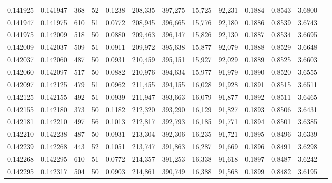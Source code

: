 \begin{tabular}{rrrrrrrrrrrrr}
0.141925 & 0.141947 &   368 &  52 &                                     0.1238 & 208,335 & 397,275 &  15,725 &  92,231 & 0.1884 & 0.8543 & 3.6800 \\
0.141947 & 0.141975 &   610 &  51 &                                     0.0772 & 208,945 & 396,665 &  15,776 &  92,180 & 0.1886 & 0.8539 & 3.6743 \\
0.141975 & 0.142009 &   518 &  50 &                                     0.0880 & 209,463 & 396,147 &  15,826 &  92,130 & 0.1887 & 0.8534 & 3.6695 \\
0.142009 & 0.142037 &   509 &  51 &                                     0.0911 & 209,972 & 395,638 &  15,877 &  92,079 & 0.1888 & 0.8529 & 3.6648 \\
0.142037 & 0.142060 &   487 &  50 &                                     0.0931 & 210,459 & 395,151 &  15,927 &  92,029 & 0.1889 & 0.8525 & 3.6603 \\
0.142060 & 0.142097 &   517 &  50 &                                     0.0882 & 210,976 & 394,634 &  15,977 &  91,979 & 0.1890 & 0.8520 & 3.6555 \\
0.142097 & 0.142125 &   479 &  51 &                                     0.0962 & 211,455 & 394,155 &  16,028 &  91,928 & 0.1891 & 0.8515 & 3.6511 \\
0.142125 & 0.142155 &   492 &  51 &                                     0.0939 & 211,947 & 393,663 &  16,079 &  91,877 & 0.1892 & 0.8511 & 3.6465 \\
0.142155 & 0.142180 &   373 &  50 &                                     0.1182 & 212,320 & 393,290 &  16,129 &  91,827 & 0.1893 & 0.8506 & 3.6431 \\
0.142181 & 0.142210 &   497 &  56 &                                     0.1013 & 212,817 & 392,793 &  16,185 &  91,771 & 0.1894 & 0.8501 & 3.6385 \\
0.142210 & 0.142238 &   487 &  50 &                                     0.0931 & 213,304 & 392,306 &  16,235 &  91,721 & 0.1895 & 0.8496 & 3.6339 \\
0.142239 & 0.142268 &   443 &  52 &                                     0.1051 & 213,747 & 391,863 &  16,287 &  91,669 & 0.1896 & 0.8491 & 3.6298 \\
0.142268 & 0.142295 &   610 &  51 &                                     0.0772 & 214,357 & 391,253 &  16,338 &  91,618 & 0.1897 & 0.8487 & 3.6242 \\
0.142295 & 0.142317 &   504 &  50 &                                     0.0903 & 214,861 & 390,749 &  16,388 &  91,568 & 0.1899 & 0.8482 & 3.6195 \\

\end{tabular}
